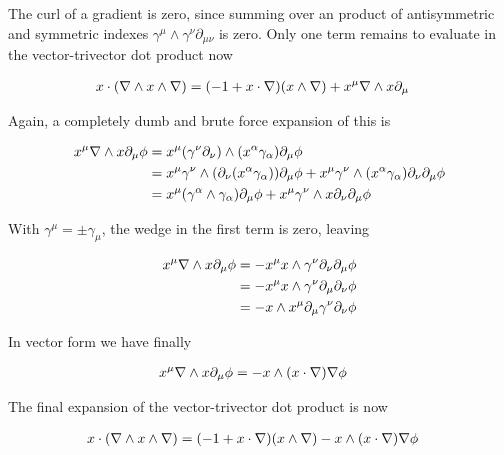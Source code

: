 The curl of a gradient is zero, since summing over an product of antisymmetric and symmetric indexes $\gamma^\mu \wedge \gamma^\nu \partial_{\mu\nu}$ is zero.  Only one term remains to evaluate in the vector-trivector dot product now

\begin{align}\label{eqn:bivectorSelect:goo8}
x \cdot (\nabla \wedge x \wedge \nabla) 
&=
(-1 + x \cdot \nabla )(x \wedge \nabla) 
+
x^\mu \nabla \wedge x \partial_\mu  
\end{align}

Again, a completely dumb and brute force expansion of this is

\begin{align*}
x^\mu \nabla \wedge x \partial_\mu \phi
&=
x^\mu (\gamma^\nu \partial_\nu) \wedge (x^\alpha \gamma_\alpha) \partial_\mu \phi \\
&=
x^\mu \gamma^\nu \wedge (\partial_\nu (x^\alpha \gamma_\alpha)) \partial_\mu \phi 
+x^\mu \gamma^\nu \wedge (x^\alpha \gamma_\alpha) \partial_\nu \partial_\mu \phi \\
&=
x^\mu (\gamma^\alpha \wedge \gamma_\alpha) \partial_\mu \phi 
+x^\mu \gamma^\nu \wedge x \partial_\nu \partial_\mu \phi \\
\end{align*}

With $\gamma^\mu = \pm \gamma_\mu$, the wedge in the first term is zero, leaving

\begin{align*}
x^\mu \nabla \wedge x \partial_\mu \phi
&=
-x^\mu x \wedge \gamma^\nu \partial_\nu \partial_\mu \phi \\
&=
-x^\mu x \wedge \gamma^\nu \partial_\mu \partial_\nu \phi \\
&=
-x \wedge x^\mu \partial_\mu \gamma^\nu \partial_\nu \phi \\
\end{align*}

In vector form we have finally

\begin{align}\label{eqn:bivectorSelect:goo9}
x^\mu \nabla \wedge x \partial_\mu \phi &= -x \wedge (x \cdot \nabla) \nabla \phi 
\end{align}

The final expansion of the vector-trivector dot product is now

\begin{align}\label{eqn:bivectorSelect:goo10}
x \cdot (\nabla \wedge x \wedge \nabla) 
&=
(-1 + x \cdot \nabla )(x \wedge \nabla) 
-x \wedge (x \cdot \nabla) \nabla \phi 
\end{align}

